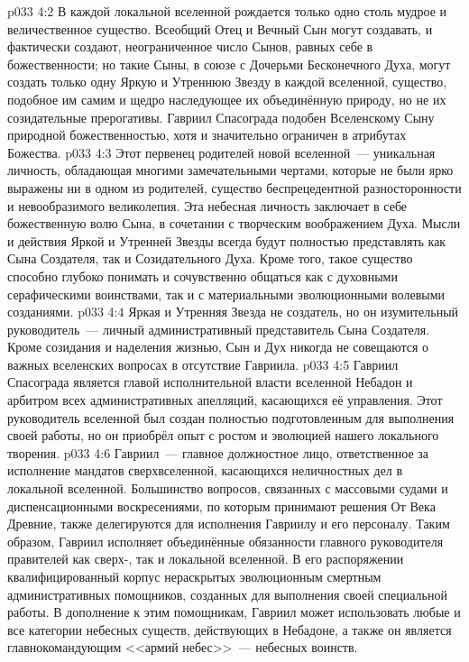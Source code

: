 \vs p033 4:2 В каждой локальной вселенной рождается только одно столь мудрое и величественное существо. Всеобщий Отец и Вечный Сын могут создавать, и фактически создают, неограниченное число Сынов, равных себе в божественности; но такие Сыны, в союзе с Дочерьми Бесконечного Духа, могут создать только одну Яркую и Утреннюю Звезду в каждой вселенной, существо, подобное им самим и щедро наследующее их объединённую природу, но не их созидательные прерогативы. Гавриил Спасограда подобен Вселенскому Сыну природной божественностью, хотя и значительно ограничен в атрибутах Божества.
\vs p033 4:3 Этот первенец родителей новой вселенной~--- уникальная личность, обладающая многими замечательными чертами, которые не были ярко выражены ни в одном из родителей, существо беспрецедентной разносторонности и невообразимого великолепия. Эта небесная личность заключает в себе божественную волю Сына, в сочетании с творческим воображением Духа. Мысли и действия Яркой и Утренней Звезды всегда будут полностью представлять как Сына Создателя, так и Созидательного Духа. Кроме того, такое существо способно глубоко понимать и сочувственно общаться как с духовными серафическими воинствами, так и с материальными эволюционными волевыми созданиями.
\vs p033 4:4 \pc Яркая и Утренняя Звезда не создатель, но он изумительный руководитель~--- личный административный представитель Сына Создателя. Кроме созидания и наделения жизнью, Сын и Дух никогда не совещаются о важных вселенских вопросах в отсутствие Гавриила.
\vs p033 4:5 Гавриил Спасограда является главой исполнительной власти вселенной Небадон и арбитром всех административных апелляций, касающихся её управления. Этот руководитель вселенной был создан полностью подготовленным для выполнения своей работы, но он приобрёл опыт с ростом и эволюцией нашего локального творения.
\vs p033 4:6 Гавриил~--- главное должностное лицо, ответственное за исполнение мандатов сверхвселенной, касающихся неличностных дел в локальной вселенной. Большинство вопросов, связанных с массовыми судами и диспенсационными воскресениями, по которым принимают решения От Века Древние, также делегируются для исполнения Гавриилу и его персоналу. Таким образом, Гавриил исполняет объединённые обязанности главного руководителя правителей как сверх-, так и локальной вселенной. В его распоряжении квалифицированный корпус нераскрытых эволюционным смертным административных помощников, созданных для выполнения своей специальной работы. В дополнение к этим помощникам, Гавриил может использовать любые и все категории небесных существ, действующих в Небадоне, а также он является главнокомандующим <<армий небес>>~--- небесных воинств.
